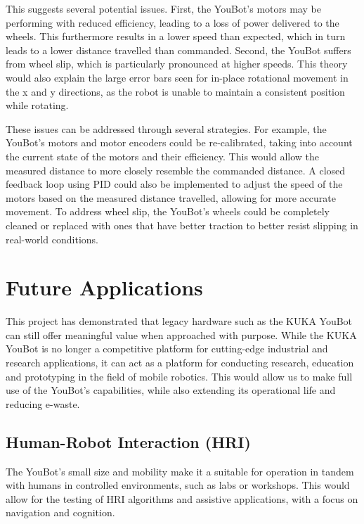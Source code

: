 \documentclass[a4paper, 12pt]{article}
\begin{document}
    This suggests several potential issues. First, the YouBot's motors may be performing with reduced efficiency, leading to a loss of power delivered to the wheels. This furthermore results in a lower speed than expected, which in turn leads to a lower distance travelled than commanded. Second, the YouBot suffers from wheel slip, which is particularly pronounced at higher speeds. This theory would also explain the large error bars seen for in-place rotational movement in the x and y directions, as the robot is unable to maintain a consistent position while rotating.

    These issues can be addressed through several strategies. For example, the YouBot's motors and motor encoders could be re-calibrated, taking into account the current state of the motors and their efficiency. This would allow the measured distance to more closely resemble the commanded distance. A closed feedback loop using PID could also be implemented to adjust the speed of the motors based on the measured distance travelled, allowing for more accurate movement. To address wheel slip, the YouBot's wheels could be completely cleaned or replaced with ones that have better traction to better resist slipping in real-world conditions. 

    \pagebreak

    \section{Future Applications}

    This project has demonstrated that legacy hardware such as the KUKA YouBot can still offer meaningful value when approached with purpose. While the KUKA YouBot is no longer a competitive platform for cutting-edge industrial and research applications, it can act as a platform for conducting research, education and prototyping in the field of mobile robotics. This would allow us to make full use of the YouBot's capabilities, while also extending its operational life and reducing e-waste.

    \subsection{Human-Robot Interaction (HRI)}

    The YouBot's small size and mobility make it a suitable for operation in tandem with humans in controlled environments, such as labs or workshops. This would allow for the testing of HRI algorithms and assistive applications, with a focus on navigation and cognition. 
\end{document}
